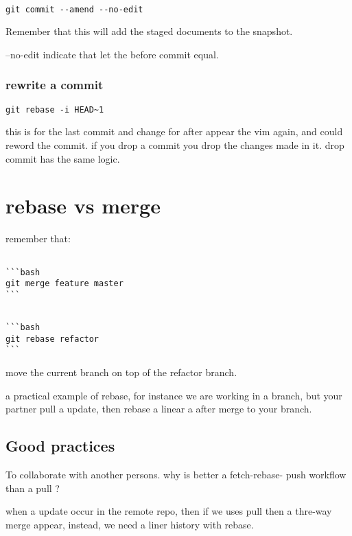 \documentclass[10pt,a4paper]{article}
\begin{document}
\begin{verbatim}

git commit --amend --no-edit
\end{verbatim}

Remember that this will add the staged 
documents to the snapshot.

--no-edit indicate that let the before commit equal.

\subsubsection{rewrite a commit}

\begin{verbatim}
git rebase -i HEAD~1
\end{verbatim}

this is for the last commit and change  for  after appear the vim again, and could reword the commit.
if you drop a commit you drop the changes made in it.
drop commit has the same logic.

\section{rebase vs merge}

remember that:

\begin{verbatim}

```bash
git merge feature master
```

\end{verbatim}


\begin{verbatim}

```bash
git rebase refactor 
```

\end{verbatim}
move the current branch on top of the refactor branch.

a practical example of rebase, for instance we 
are working in a branch, but your partner pull a update, then rebase a linear
a after merge to your branch.




\subsection{Good practices} 
To collaborate with another persons. why is better a 
fetch-rebase- push workflow than a pull ?

when a update occur in the remote repo, then 
if we uses pull then a thre-way merge appear, 
instead, we need a liner history with rebase. 
\end{document}
